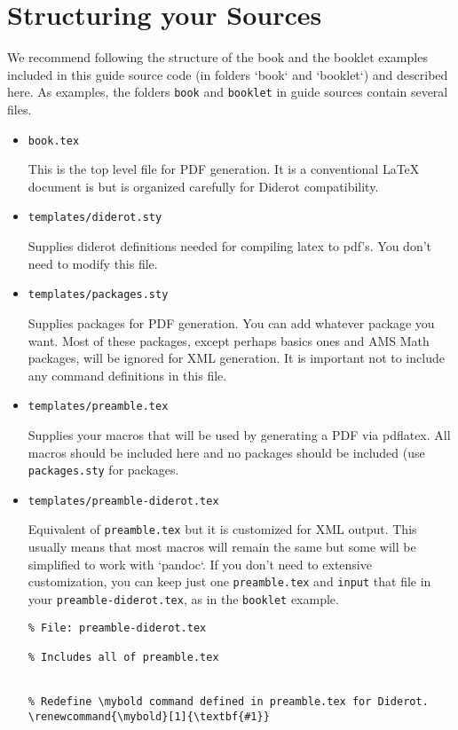 \section{Structuring your Sources}
\label{sec:publish::latex-structure}
%
We recommend following the structure
of the book and the booklet examples included in this guide source
code (in folders `book` and `booklet`) and described here.
%
As examples, 
the folders \lstinline`book` and \lstinline`booklet` in guide sources contain several files.
%
\begin{itemize}
\item \lstinline`book.tex`

This is the top level file for PDF generation.  It is a conventional LaTeX document is but is organized carefully for Diderot compatibility.

\item \lstinline`templates/diderot.sty`

Supplies diderot definitions needed for compiling latex to pdf's.
You don't need to modify this file.

\item \lstinline`templates/packages.sty`

Supplies packages for PDF generation.  You can add whatever package
you want.  Most of these packages, except perhaps basics ones and AMS
Math packages, will be ignored for XML generation.  It is important not to include any command definitions in this file.

\item \lstinline`templates/preamble.tex` 

Supplies your macros that will be used by generating a PDF via pdflatex.  All macros should be included here and no packages should be included (use \lstinline`packages.sty` for packages.  


\item \lstinline`templates/preamble-diderot.tex` 

Equivalent of \lstinline`preamble.tex` but it is customized for XML output.  This usually means that most macros will remain the same but some will be simplified to work with `pandoc`.  If you don't need to extensive customization, you can keep just one \lstinline`preamble.tex` and \lstinline`input` that file in your \lstinline`preamble-diderot.tex`, as in the \lstinline`booklet` example.
%
\begin{lstlisting}
% File: preamble-diderot.tex

% Includes all of preamble.tex


% Redefine \mybold command defined in preamble.tex for Diderot.
\renewcommand{\mybold}[1]{\textbf{#1}}
\end{lstlisting}
\end{itemize}    

